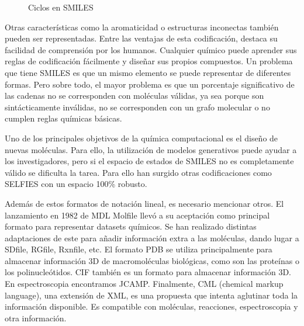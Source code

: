 \begin{figure}[H]
\centering
    \caption{Ciclos en SMILES} 
\end{figure}

Otras características como la aromaticidad o estructuras inconectas también pueden ser representadas. Entre las ventajas de esta codificación, destaca su facilidad de comprensión por los humanos. Cualquier químico puede aprender sus reglas de codificación fácilmente y diseñar sus propios compuestos. Un problema que tiene SMILES es que un mismo elemento se puede representar de diferentes formas. Pero sobre todo, el mayor problema es que un porcentaje significativo de las cadenas no se corresponden con moléculas válidas, ya sea porque son sintácticamente inválidas, no se corresponden con un grafo molecular o no cumplen reglas químicas básicas. \cite{weininger1988smiles}

Uno de los principales objetivos de la química computacional es el diseño de nuevas moléculas. Para ello, la utilización de modelos generativos puede ayudar a los investigadores, pero si el espacio de estados de SMILES no es completamente válido se dificulta la tarea. Para ello han surgido otras codificaciones como SELFIES con un espacio 100\% robusto. \cite{Krenn_2020}

Además de estos formatos de notación lineal, es necesario mencionar otros. El lanzamiento en 1982 de MDL Molfile llevó a su aceptación como principal formato para representar datasets químicos. Se han realizado distintas adaptaciones de este para añadir información extra a las moléculas, dando lugar a SDfile, RGfile, Rxnfile, etc. El formato PDB se utiliza principalmente para almacenar información 3D de macromoléculas biológicas, como son las proteínas o los polinucleótidos. CIF también es un formato para almacenar información 3D. En espectroscopia encontramos JCAMP. Finalmente, CML (chemical markup language), una extensión de XML, es una propuesta que intenta aglutinar toda la información disponible. Es compatible con moléculas, reacciones, espectroscopia y otra información. \cite{doi:10.1021/ci600234z}

